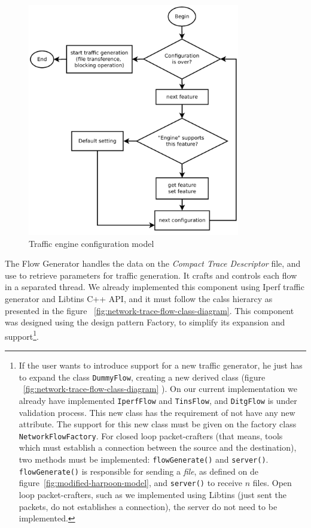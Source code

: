 \begin{figure}[ht!]
	\centering
	\includegraphics[height=4.0in]{figures/ch3/alg-traffic-engine-config}
	\caption{Traffic engine configuration model}
	\label{fig:alg-traffic-engine-config}
\end{figure}


The Flow Generator handles the data on the \textit{Compact Trace Descriptor} file, and use to retrieve parameters for traffic generation. It crafts and controls each flow in a separated thread. We already implemented this component using Iperf traffic generator and Libtins C++ API, and it must follow the calss hierarcy as presented in the figure ~\ref{fig:network-trace-flow-class-diagram}.  This component was designed using the design pattern Factory, to simplify its expansion and support\footnote{If the user wants to introduce support for a new traffic generator, he just has to expand the class \texttt{DummyFlow}, creating a new derived class (figure ~\ref{fig:network-trace-flow-class-diagram} ). On our current implementation we already have implemented \texttt{IperfFlow} and \texttt{TinsFlow}, and \texttt{DitgFlow} is under validation process. This new class has the requirement of not have any new attribute. The support for this new class must be given on the factory class \texttt{NetworkFlowFactory}. For closed loop packet-crafters (that means, tools which must establish a connection between the source and the destination), two methods must be implemented: \texttt{flowGenerate()} and \texttt{server()}. \texttt{flowGenerate()} is responsible for sending a \textit{file}, as defined on de figure~\ref{fig:modified-harpoon-model}, and \texttt{server()} to receive $n$ files. Open loop packet-crafters, such as we implemented using Libtins (just sent the packets, do not establishes a connection), the server do not need to be implemented.}. 




